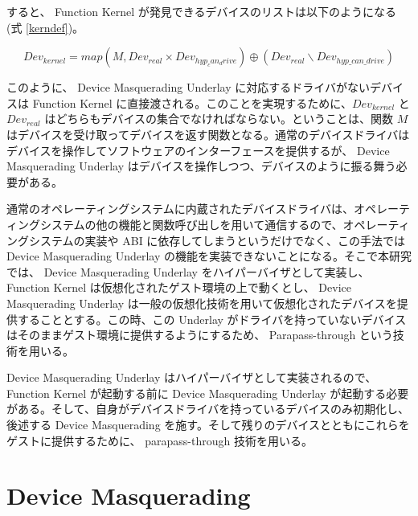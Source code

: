 \documentclass[a4paper,11pt,report]{ltjsbook}
\begin{document}
すると、 Function Kernel が発見できるデバイスのリストは以下のようになる (式 \ref{kerndef})。

\begin{equation}
Dev_{kernel} = map(M, Dev_{real} \times Dev_{hyp_can_drive}) \oplus (Dev_{real} \backslash Dev_{hyp\_can\_drive}) \label{kerndef}
\end{equation}

このように、 Device Masquerading Underlay に対応するドライバがないデバイスは Function Kernel に直接渡される。このことを実現するために、$Dev_{kernel}$ と $Dev_{real}$ はどちらもデバイスの集合でなければならない。ということは、関数 $M$ はデバイスを受け取ってデバイスを返す関数となる。通常のデバイスドライバはデバイスを操作してソフトウェアのインターフェースを提供するが、 Device Masquerading Underlay はデバイスを操作しつつ、デバイスのように振る舞う必要がある。

通常のオペレーティングシステムに内蔵されたデバイスドライバは、オペレーティングシステムの他の機能と関数呼び出しを用いて通信するので、オペレーティングシステムの実装や ABI に依存してしまうというだけでなく、この手法では Device Masquerading Underlay の機能を実装できないことになる。そこで本研究では、 Device Masquerading Underlay をハイパーバイザとして実装し、 Function Kernel は仮想化されたゲスト環境の上で動くとし、 Device Masquerading Underlay は一般の仮想化技術を用いて仮想化されたデバイスを提供することとする。この時、この Underlay がドライバを持っていないデバイスはそのままゲスト環境に提供するようにするため、 Parapass-through \cite{bitvisor} という技術を用いる。

Device Masquerading Underlay はハイパーバイザとして実装されるので、 Function Kernel が起動する前に Device Masquerading Underlay が起動する必要がある。そして、自身がデバイスドライバを持っているデバイスのみ初期化し、後述する Device Masquerading を施す。そして残りのデバイスとともにこれらをゲストに提供するために、 parapass-through 技術を用いる。

\section{Device Masquerading}
\end{document}
